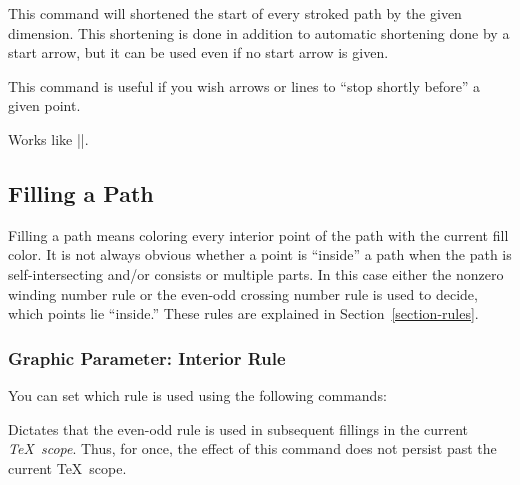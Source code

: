\begin{command}{\pgfsetshortenstart{}}
  This command will shortened the start of every stroked path by the
  given dimension. This shortening is done in addition to automatic
  shortening done by a start arrow, but it can be used even if no
  start arrow is given.

  This command is useful if you wish arrows or lines to ``stop shortly
  before'' a given point.
\begin{codeexample}[]
\begin{pgfpicture}
  \pgfpathcircle{\pgfpointorigin}{5mm}
  \pgfsetshortenstart{4pt}
  \pgfpathmoveto{\pgfpoint{5mm}{0cm}} %
  \pgfpathlineto{\pgfpoint{2cm}{0cm}}
\end{pgfpicture}
\end{codeexample}
\end{command}
  
\begin{command}{\pgfsetshortenend{}}
  Works like |\pgfsetshortenstart|.
\end{command}



\subsection{Filling a Path}
\label{section-fill}

Filling a path means coloring every interior point of the path with
the current fill color. It is not always obvious whether a point is
``inside'' a  path when the path is self-intersecting and/or consists
or multiple parts. In this case either the nonzero winding number rule
or the even-odd crossing number rule is used to decide, which points
lie ``inside.'' These rules are explained in
Section~\ref{section-rules}. 

\subsubsection{Graphic Parameter: Interior Rule}

You can set which rule is used using the following commands:

\begin{command}{\pgfseteorule}
  Dictates that the even-odd rule is used in subsequent fillings in
  the current \emph{\TeX\ scope}. Thus, for once, the effect of this
  command does not persist past the current \TeX\ scope.

\begin{codeexample}[]
\begin{pgfpicture}
  \pgfseteorule
  \pgfpathcircle{\pgfpoint{0mm}{0cm}}{7mm}
  \pgfpathcircle{\pgfpoint{5mm}{0cm}}{7mm}
\end{pgfpicture}
\end{codeexample}
\end{command}

